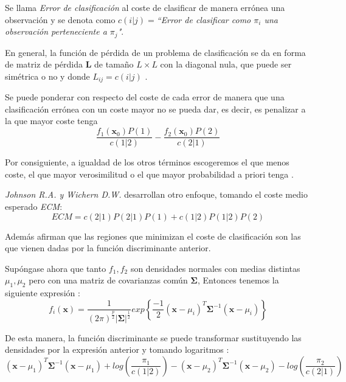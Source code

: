 \begin{defi}
Se llama \emph{Error de clasificación} al coste de clasificar de manera errónea una observación y se denota como $c(i|j)=$\emph{``Error de clasificar como $\pi_i$ una observación perteneciente a $\pi_j$"}.
\end{defi}

\noindent En general, la función de pérdida de un problema de clasificación se da en forma de matriz de pérdida $\mathbf{L}$ de tamaño $L\times L$ con la diagonal nula, que puede ser simétrica o no y donde $L_{ij}=c(i|j)$ \cite{Hastie 2001}. 

\noindent Se puede ponderar con respecto del coste de cada error de manera que una clasificación errónea con un coste mayor no se pueda dar, es decir, es penalizar a la que mayor coste tenga 
\begin{equation}
\dfrac{f_1(\textbf{x}_0)P(1)}{c(1|2)}-\dfrac{f_2(\textbf{x}_0)P(2)}{c(2|1)}
\end{equation}

\noindent Por consiguiente, a igualdad de los otros términos escogeremos el que menos coste, el que mayor verosimilitud  o el que mayor probabilidad a priori tenga \cite{Peña 2002}.

\noindent \emph{Johnson R.A. y Wichern D.W.}\cite{Johnson 2007} desarrollan otro enfoque, tomando el coste medio esperado \emph{ECM}:
\begin{equation}
ECM=c(2|1)P(2|1)P(1)+c(1|2)P(1|2)P(2)
\end{equation}

\noindent Además afirman que las regiones que minimizan el coste de clasificación son las que vienen dadas por la función discriminante anterior. 

\noindent Supóngase ahora que tanto $f_1,f_2$ son densidades normales con medias distintas $\mu_1,\mu_2$ pero con una matriz de covarianzas común $\mathbf{\Sigma}$, Entonces tenemos la siguiente expresión \cite{Johnson 2007, Cuadras 2014}:
\begin{equation}
f_i(\textbf{x})=\dfrac{1}{(2\pi)^{\frac{p}{2}}|\mathbf{\Sigma}|^{\frac{1}{2}}} exp \left\lbrace\dfrac{-1}{2}(\textbf{x}-\mu_i)^T \mathbf{\Sigma}^{-1}(\textbf{x}-\mu_i) \right\rbrace
\end{equation}

\noindent De esta manera, la función discriminante se puede transformar sustituyendo las densidades por la expresión anterior y tomando logaritmos : 
\begin{equation}
(\textbf{x}-\mu_1)^T \mathbf{\Sigma}^{-1}(\textbf{x}-\mu_1)+log\left(\dfrac{\pi_1}{c(1|2)}\right)-(\textbf{x}-\mu_2)^T \mathbf{\Sigma}^{-1} (\textbf{x}-\mu_2)-log\left(\dfrac{\pi_2}{c(2|1)}\right)
\end{equation}

